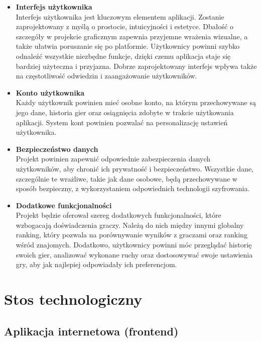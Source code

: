 \documentclass[12pt,a4paper]{article}
\begin{document}
\begin{itemize}
    \item \textbf{Interfejs użytkownika}\\
    Interfejs użytkownika jest kluczowym elementem aplikacji. Zostanie zaprojektowany z myślą o prostocie, intuicyjności i estetyce. Dbałość o szczegóły w projekcie graficznym zapewnia przyjemne wrażenia wizualne, a także ułatwia poruszanie się po platformie. Użytkownicy powinni szybko odnaleźć wszystkie niezbędne funkcje, dzięki czemu aplikacja staje się bardziej użyteczna i przyjazna. Dobrze zaprojektowany interfejs wpływa także na częstotliwość odwiedzin i zaangażowanie użytkowników.

    \item \textbf{Konto użytkownika}\\
    Każdy użytkownik powinien mieć osobne konto, na którym przechowywane są jego dane, historia gier oraz osiągnięcia zdobyte w trakcie użytkowania aplikacji. System kont powinien pozwalać na personalizację ustawień użytkownika.

    \item \textbf{Bezpieczeństwo danych}\\
    Projekt powinien zapewnić odpowiednie zabezpieczenia danych użytkowników, aby chronić ich prywatność i bezpieczeństwo. Wszystkie dane, szczególnie te wrażliwe, takie jak dane osobowe, będą przechowywane w sposób bezpieczny, z wykorzystaniem odpowiednich technologii szyfrowania.

    \item \textbf{Dodatkowe funkcjonalności}\\
    Projekt będzie oferował szereg dodatkowych funkcjonalności, które wzbogacają doświadczenia graczy. Należą do nich między innymi globalny ranking, który pozwala na porównywanie wyników z graczami oraz ranking wśród znajomych. Dodatkowo, użytkownicy powinni móc przeglądać historię swoich gier, analizować wykonane ruchy oraz dostosowywać swoje ustawienia gry, aby jak najlepiej odpowiadały ich preferencjom.

\end{itemize}

\newpage

\section{Stos technologiczny}

\subsection{Aplikacja internetowa (frontend)}
\end{document}
